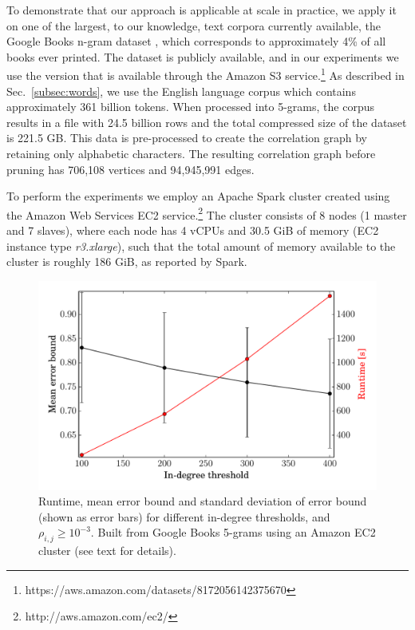 \documentclass[conference]{IEEEtran}
\newcommand{\rn}[1]{\rho_{#1}}
\begin{document}
To demonstrate that our approach is applicable at scale in practice, we apply it on one of the largest, to our knowledge,
text corpora currently available, the Google Books
n-gram dataset \cite{Michel10,Lin12}, which corresponds to approximately 4\% of all books ever printed.
The dataset is publicly available, and in our experiments we use
the version that is available through the Amazon S3 service.\footnote{https://aws.amazon.com/datasets/8172056142375670}
As described in Sec.\ \ref{subsec:words}, we use the English language corpus
which contains approximately 361 billion tokens. When processed into 5-grams, the corpus results in a file with 24.5 billion 
rows and the total compressed size of the dataset is 221.5 GB. This data is pre-processed to create the correlation graph by retaining
only alphabetic characters. The resulting correlation graph before pruning has 706,108 vertices and 94,945,991 edges.

To perform the experiments we employ an Apache Spark cluster created using the Amazon
Web Services EC2 service.\footnote{http://aws.amazon.com/ec2/}
The cluster consists of 8 nodes (1 master and 7 slaves), where each node has 4 vCPUs and
30.5 GiB of memory (EC2 instance type \emph{r3.xlarge}), such that the total amount of memory available to the cluster
is roughly 186 GiB, as reported by Spark.

\begin{figure}
\begin{centering}
\includegraphics[width=1.0\columnwidth]{figures/eng-all-edge-low-e3-vtx-low-e8-high-e1-100-400.pdf}
\end{centering}
\caption{Runtime, mean error bound and standard deviation of error bound (shown as error bars) for different in-degree 
thresholds, and $\rn{i,j} \geq 10^{-3}$. Built from Google Books 5-grams using an Amazon
EC2 cluster (see text for details).}
\label{fig:google-e-runtime}
\end{figure}
\end{document}
